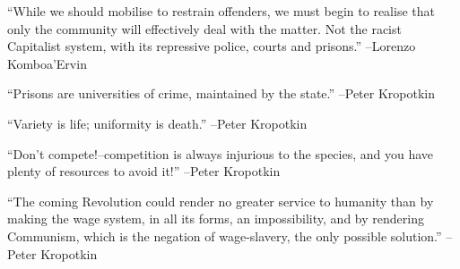 \documentclass{article}%
\begin{document}
\linebreak%
\vspace{1mm}%
\begin{minipage}{\textwidth}%
\flushleft%
“While we should mobilise to restrain offenders, we must begin to realise that only the community will effectively deal with the matter. Not the racist Capitalist system, with its repressive police, courts and prisons.”%
\linebreak%
\vspace{1mm}%
–Lorenzo Komboa'Ervin%
\linebreak%
\vspace{1mm}%
\end{minipage}%
\linebreak%
\vspace{1mm}%
\begin{minipage}{\textwidth}%
\flushleft%
“Prisons are universities of crime, maintained by the state.”%
\linebreak%
\vspace{1mm}%
–Peter Kropotkin%
\linebreak%
\vspace{1mm}%
\end{minipage}%
\linebreak%
\vspace{1mm}%
\begin{minipage}{\textwidth}%
\flushleft%
“Variety is life; uniformity is death.”%
\linebreak%
\vspace{1mm}%
–Peter Kropotkin%
\linebreak%
\vspace{1mm}%
\end{minipage}%
\linebreak%
\vspace{1mm}%
\begin{minipage}{\textwidth}%
\flushleft%
“Don't compete!–competition is always injurious to the species, and you have plenty of resources to avoid it!”%
\linebreak%
\vspace{1mm}%
–Peter Kropotkin%
\linebreak%
\vspace{1mm}%
\end{minipage}%
\linebreak%
\vspace{1mm}%
\begin{minipage}{\textwidth}%
\flushleft%
“The coming Revolution could render no greater service to humanity than by making the wage system, in all its forms, an impossibility, and by rendering Communism, which is the negation of wage{-}slavery, the only possible solution.”%
\linebreak%
\vspace{1mm}%
–Peter Kropotkin%
\linebreak%
\vspace{1mm}%
\end{minipage}%
\end{document}
